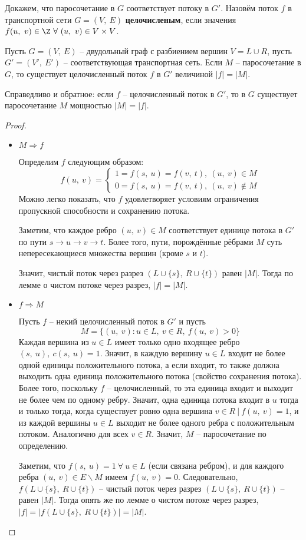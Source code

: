 \documentclass[a4paper,12pt]{article}
\begin{document}
Докажем, что паросочетание в $G$ соответствует потоку в $G'$. Назовём поток $f$ в транспортной сети $G = (V,\ E)$ \textbf{целочисленым}, если значения $f(u,\ v) \in \Z\ \forall\ (u,\ v) \in V\times V$.
\begin{fulllemma}
Пусть $G = (V,\ E)$ -- двудольный граф с разбиением вершин $V = L \cup R$, пусть $G' = (V',\ E')$ -- соответствующая транспортная сеть. Если $M$ -- паросочетание в $G$, то существует целочисленный поток $f$ в $G'$ величиной $|f| = |M|$.

Справедливо и обратное: если $f$ -- целочисленный поток в $G'$, то в $G$ существует паросочетание $M$ мощностью $|M| = |f|$.
\end{fulllemma}
\begin{proof}
\begin{itemize}
\ \\
    \item $M \Longrightarrow f$
    
    Определим $f$ следующим образом: \[f(u,\ v) = \begin{cases} 1 = f(s,\ u) = f(v,\ t),\ (u,\ v) \in M \\ 0 = f(s,\ u) = f(v,\ t),\ (u,\ v) \notin M\end{cases}\] Можно легко показать, что $f$ удовлетворяет условиям ограничения пропускной способности и сохранению потока.
    
    Заметим, что каждое ребро $(u,\ v) \in M$ соответствует единице потока в $G'$ по пути $s \to u \to v \to t$. Более того, пути, порождённые рёбрами $M$ суть непересекающиеся множества вершин (кроме $s$ и $t$).
    
    Значит, чистый поток через разрез $(L \cup \{s\},\ R \cup \{t\})$ равен $|M|$. Тогда по лемме о чистом потоке через разрез, $|f| = |M|$.
    
    \item $f \Longrightarrow M$
    
    Пусть $f$ -- некий целочисленный поток в $G'$ и пусть\[ M = \{(u,\ v): u \in L,\ v \in R,\ f(u,\ v) > 0\}\]
    Каждая вершина из $u \in L$ имеет только одно входящее ребро $(s,\ u),\ c(s,\ u) = 1$. Значит, в каждую вершину $u \in L$ входит не более одной единицы  положительного потока, а если входит, то также должна выходить одна единица положительного потока (свойство сохранения потока). Более того, поскольку $f$ -- целочисленный, то эта единица входит и выходит не более чем по одному ребру. Значит, одна единица потока входит в $u$ тогда и только тогда, когда существует ровно одна вершина $v \in R\ |\ f(u,\ v) = 1$, и из каждой вершины $u\in L$ выходит не более одного ребра с положительным потоком. Аналогично для всех $v \in R$. Значит, $M$ -- паросочетание по определению.
    
    Заметим, что $f(s,\ u) = 1\ \forall\ u \in L$ (если связана ребром), и для каждого ребра $(u,\ v) \in E\backslash M$ имеем $f(u,\ v) = 0$. Следовательно, $f(L\cup \{s\},\ R\cup \{t\})$ -- чистый поток через разрез $(L\cup \{s\},\ R\cup \{t\})$ -- равен $|M|$. Тогда опять же по лемме о чистом потоке через разрез, $|f| = |f(L\cup \{s\},\ R\cup \{t\})| = |M|$.
\end{itemize}
\end{proof}
\end{document}

